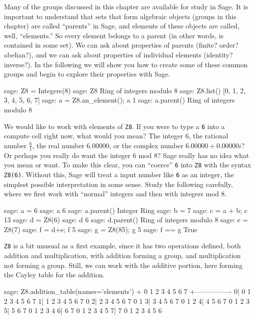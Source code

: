 Many of the groups discussed in this chapter are available for study in Sage.  It is important to understand that sets that form algebraic objects (groups in this chapter) are called ``parents'' in Sage, and elements of these objects are called, well, ``elements.''  So every element belongs to a parent (in other words, is contained in some set).  We can ask about properties of parents (finite? order? abelian?), and we can ask about properties of individual elements (identity? inverse?).  In the following we will show you how to create some of these common groups and begin to explore their properties with Sage.
%
%
\begin{sageexample}
sage: Z8 = Integers(8)
sage: Z8
Ring of integers modulo 8
sage: Z8.list()
[0, 1, 2, 3, 4, 5, 6, 7]
sage: a = Z8.an_element(); a
1
sage: a.parent()
Ring of integers modulo 8
\end{sageexample}
%
We would like to work with elements of \verb?Z8?.  If you were to type a \verb?6? into a compute cell right now, what would you mean?  The integer $6$, the rational number $\frac{6}{1}$, the real number $6.00000$, or the complex number $6.00000+0.00000i$?  Or perhaps you really do want the integer $6$ mod $8$?  Sage really has no idea what you mean or want.  To make this clear, you can ``coerce'' \verb?6? into \verb?Z8? with the syntax \verb?Z8(6)?.  Without this, Sage will treat a input number like \verb?6? as an integer, the simplest possible interpretation in some sense.  Study the following carefully, where we first work with ``normal'' integers and then with integers mod 8.
%
\begin{sageexample}
sage: a = 6
sage: a
6
sage: a.parent()
Integer Ring
sage: b = 7
sage: c = a + b; c
13
sage: d = Z8(6)
sage: d
6
sage: d.parent()
Ring of integers modulo 8
sage: e = Z8(7)
sage: f = d+e; f
5
sage: g = Z8(85); g
5
sage: f == g
True
\end{sageexample}
%
\verb?Z8? is a bit unusual as a first example, since it has two operations defined, both addition and multiplication, with addition forming a group, and multiplication not forming a group.  Still, we can work with the additive portion, here forming the Cayley table for the addition.
%
\begin{sageexample}
sage: Z8.addition_table(names='elements')
+  0 1 2 3 4 5 6 7
 +----------------
0| 0 1 2 3 4 5 6 7
1| 1 2 3 4 5 6 7 0
2| 2 3 4 5 6 7 0 1
3| 3 4 5 6 7 0 1 2
4| 4 5 6 7 0 1 2 3
5| 5 6 7 0 1 2 3 4
6| 6 7 0 1 2 3 4 5
7| 7 0 1 2 3 4 5 6
\end{sageexample}
